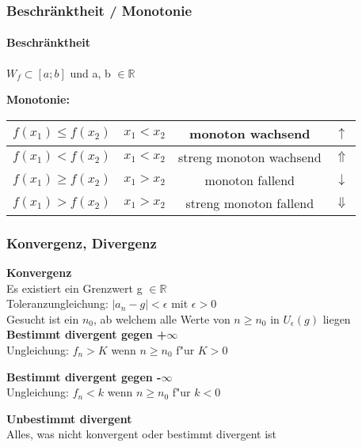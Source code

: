 \subsubsection{Beschränktheit / Monotonie}
    \paragraph{Beschränktheit}
        $W_f \subset [a ; b]$ und a, b $\in \mathbb{R}$		
    
    \textbf{Monotonie:} \\
    
    \begin{tabular}{|c|c|c|c|}
        \hline
        $f(x_1) \leq f(x_2)$ & $x_1 < x_2$ & monoton wachsend & $\uparrow$\\
        \hline
        $f(x_1) < f(x_2)$ & $x_1 < x_2$ & streng monoton wachsend & $\Uparrow$\\
        \hline
        $f(x_1) \geq f(x_2)$ & $x_1 > x_2$ & monoton fallend & $\downarrow$\\
        \hline
        $f(x_1) > f(x_2)$ & $x_1 > x_2$ & streng monoton fallend & $\Downarrow$\\
        \hline
    \end{tabular}
    
\subsubsection{Konvergenz, Divergenz}
    \textbf{Konvergenz} \\
        Es existiert ein Grenzwert g $\in \mathbb{R}$ \\
        Toleranzungleichung: $\vert a_n - g \vert < \epsilon$  mit $\epsilon > 0$ \\
        Gesucht ist ein $n_0$, ab welchem alle Werte von $n \geq n_0$ in $U_\epsilon(g)$ liegen \\
        
    \textbf{Bestimmt divergent gegen +$\infty$} \\
        Ungleichung: $f_n > K$ wenn $n \geq  n_0$ f"ur $K > 0$ 
        
    \textbf{Bestimmt divergent gegen -$\infty$} \\
        Ungleichung: $f_n < k$ wenn $n \geq  n_0$ f"ur $k < 0$ 
        
    \textbf{Unbestimmt divergent} \\
        Alles, was nicht konvergent oder bestimmt divergent ist
        

